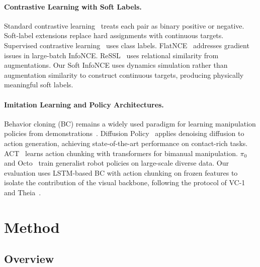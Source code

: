 \documentclass{article}
\begin{document}
\paragraph{Contrastive Learning with Soft Labels.}
Standard contrastive learning~\cite{chen2020simclr,he2020moco} treats each pair as binary positive or negative. Soft-label extensions replace hard assignments with continuous targets. Supervised contrastive learning~\cite{khosla2020supervised} uses class labels. FlatNCE~\cite{chen2023flatnce} addresses gradient issues in large-batch InfoNCE. ReSSL~\cite{zheng2021ressl} uses relational similarity from augmentations. Our Soft InfoNCE uses dynamics simulation rather than augmentation similarity to construct continuous targets, producing physically meaningful soft labels.

\paragraph{Imitation Learning and Policy Architectures.}
Behavior cloning (BC) remains a widely used paradigm for learning manipulation policies from demonstrations~\cite{pomerleau1988alvinn}. Diffusion Policy~\cite{chi2023diffusion} applies denoising diffusion to action generation, achieving state-of-the-art performance on contact-rich tasks. ACT~\cite{zhao2023act} learns action chunking with transformers for bimanual manipulation. $\pi_0$~\cite{black2024pi0} and Octo~\cite{team2024octo} train generalist robot policies on large-scale diverse data. Our evaluation uses LSTM-based BC with action chunking on frozen features to isolate the contribution of the visual backbone, following the protocol of VC-1~\cite{radosavovic2023vc1} and Theia~\cite{shang2024theia}.


\section{Method}
\label{sec:method}

\subsection{Overview}
\end{document}
